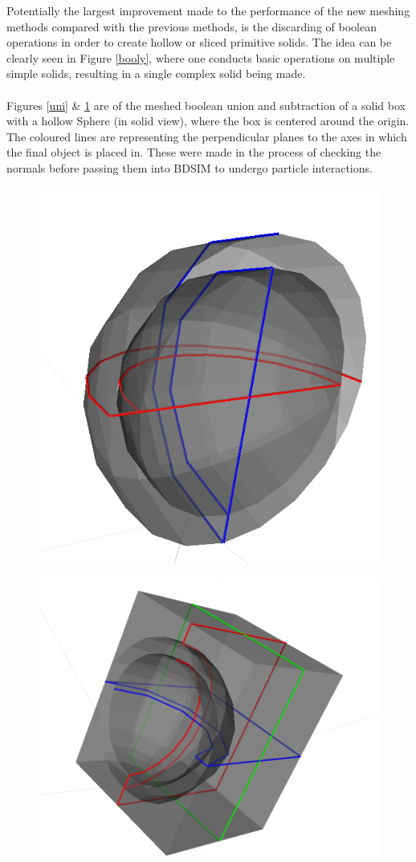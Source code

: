 \documentclass[12pt,a4paper]{article}
\begin{document}
\noindent Potentially the largest improvement made to the performance of the new meshing methods compared with the previous methods, is the discarding of boolean operations in order to create hollow or sliced primitive solids. The idea can be clearly seen in Figure \ref{booly}, where one conducts basic operations on multiple simple solids, resulting in a single complex solid being made.
\\\\
\noindent Figures \ref{uni} \& \ref{sub} are of the meshed boolean union and subtraction of a solid box with a hollow Sphere (in solid view), where the box is centered around the origin. The coloured lines are representing the perpendicular planes to the axes in which the final object is placed in. These were made in the process of checking the normals before passing them into BDSIM to undergo particle interactions.
\\
\begin{figure}[h!]
\centering
\begin{minipage}{.4\textwidth}
  \centering
  \includegraphics[height=0.5\linewidth]{Images//Booleans/SphereUnion.png}
  \label{uni}
\end{minipage}%
\begin{minipage}{.4\textwidth}
  \centering
  \includegraphics[height=0.5\linewidth]{Images//Booleans//SphereSubtraction.png}
  \label{sub}
\end{minipage}%
\end{figure}
\end{document}

